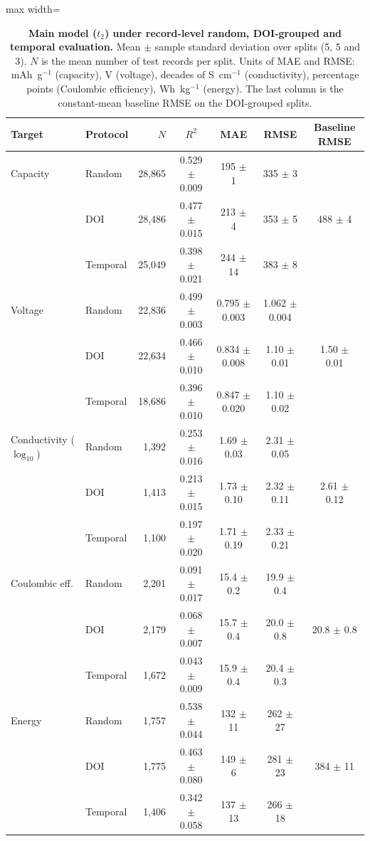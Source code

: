 \documentclass[journal=jcisd8,manuscript=article,layout=traditional]{achemso}
\begin{document}
\begin{table}[htbp]
    \centering\small
    \caption{\textbf{Main model ($t_2$) under record-level random, DOI-grouped and temporal evaluation.} Mean $\pm$ sample standard deviation over splits (5, 5 and 3). $N$ is the mean number of test records per split. Units of MAE and RMSE: mAh~g$^{-1}$ (capacity), V (voltage), decades of S~cm$^{-1}$ (conductivity), percentage points (Coulombic efficiency), Wh~kg$^{-1}$ (energy). The last column is the constant-mean baseline RMSE on the DOI-grouped splits.}
    \label{tab:split}
    \begin{adjustbox}{max width=\textwidth}
    \begin{tabular}{@{}llrcccc@{}}
        \toprule
        Target & Protocol & $N$ & $R^2$ & MAE & RMSE & Baseline RMSE \\
        \midrule
        Capacity & Random   & 28,865 & 0.529 $\pm$ 0.009 & 195 $\pm$ 1 & 335 $\pm$ 3 & \\
        & DOI      & 28,486 & 0.477 $\pm$ 0.015 & 213 $\pm$ 4 & 353 $\pm$ 5 & 488 $\pm$ 4 \\
        & Temporal & 25,049 & 0.398 $\pm$ 0.021 & 244 $\pm$ 14 & 383 $\pm$ 8 & \\
        \midrule
        Voltage  & Random   & 22,836 & 0.499 $\pm$ 0.003 & 0.795 $\pm$ 0.003 & 1.062 $\pm$ 0.004 & \\
        & DOI      & 22,634 & 0.466 $\pm$ 0.010 & 0.834 $\pm$ 0.008 & 1.10 $\pm$ 0.01 & 1.50 $\pm$ 0.01 \\
        & Temporal & 18,686 & 0.396 $\pm$ 0.010 & 0.847 $\pm$ 0.020 & 1.10 $\pm$ 0.02 & \\
        \midrule
        Conductivity ($\log_{10}$) & Random & 1,392 & 0.253 $\pm$ 0.016 & 1.69 $\pm$ 0.03 & 2.31 $\pm$ 0.05 & \\
        & DOI      & 1,413 & 0.213 $\pm$ 0.015 & 1.73 $\pm$ 0.10 & 2.32 $\pm$ 0.11 & 2.61 $\pm$ 0.12 \\
        & Temporal & 1,100 & 0.197 $\pm$ 0.020 & 1.71 $\pm$ 0.19 & 2.33 $\pm$ 0.21 & \\
        \midrule
        Coulombic eff. & Random & 2,201 & 0.091 $\pm$ 0.017 & 15.4 $\pm$ 0.2 & 19.9 $\pm$ 0.4 & \\
        & DOI      & 2,179 & 0.068 $\pm$ 0.007 & 15.7 $\pm$ 0.4 & 20.0 $\pm$ 0.8 & 20.8 $\pm$ 0.8 \\
        & Temporal & 1,672 & 0.043 $\pm$ 0.009 & 15.9 $\pm$ 0.4 & 20.4 $\pm$ 0.3 & \\
        \midrule
        Energy   & Random   & 1,757 & 0.538 $\pm$ 0.044 & 132 $\pm$ 11 & 262 $\pm$ 27 & \\
        & DOI      & 1,775 & 0.463 $\pm$ 0.080 & 149 $\pm$ 6 & 281 $\pm$ 23 & 384 $\pm$ 11 \\
        & Temporal & 1,406 & 0.342 $\pm$ 0.058 & 137 $\pm$ 13 & 266 $\pm$ 18 & \\
        \bottomrule
    \end{tabular}
    \end{adjustbox}
\end{table}
\end{document}
